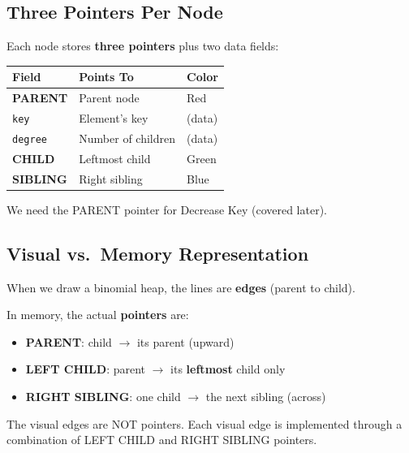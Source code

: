 \documentclass[11pt]{article}
\begin{document}
\subsection{Three Pointers Per Node}

\begin{keybox}
Each node stores \textbf{three pointers} plus two data fields:

\begin{center}
\renewcommand{\arraystretch}{1.4}
\begin{tabular}{l l l}
\hline
\textbf{Field} & \textbf{Points To} & \textbf{Color}\\
\hline
\textcolor{rustW}{\textbf{PARENT}} & Parent node & \textcolor{rustW}{Red}\\
\texttt{key} & Element's key & (data)\\
\texttt{degree} & Number of children & (data)\\
\textcolor{greenO}{\textbf{CHILD}} & Leftmost child & \textcolor{greenO}{Green}\\
\textcolor{heapblue}{\textbf{SIBLING}} & Right sibling & \textcolor{heapblue}{Blue}\\
\hline
\end{tabular}
\end{center}

We need the \textcolor{rustW}{PARENT} pointer for Decrease Key (covered later).
\end{keybox}

\subsection{Visual vs.\ Memory Representation}

\begin{warnbox}
When we draw a binomial heap, the lines are \textbf{edges} (parent to child).

In memory, the actual \textbf{pointers} are:
\begin{itemize}[leftmargin=1.4em,itemsep=2pt]
  \item \textcolor{rustW}{\textbf{PARENT}}: child $\to$ its parent (upward)
  \item \textcolor{greenO}{\textbf{LEFT CHILD}}: parent $\to$ its \textbf{leftmost} child only
  \item \textcolor{heapblue}{\textbf{RIGHT SIBLING}}: one child $\to$ the next sibling (across)
\end{itemize}
The visual edges are NOT pointers. Each visual edge is implemented through a combination of LEFT CHILD and RIGHT SIBLING pointers.
\end{warnbox}
\end{document}
